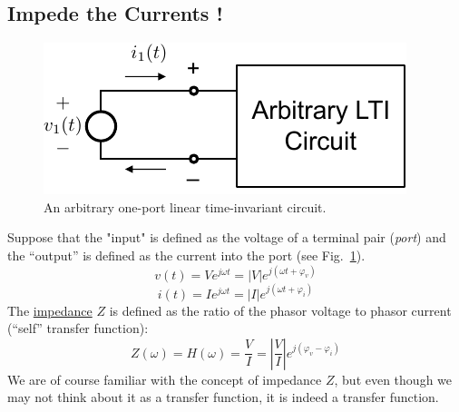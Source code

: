 \subsection{Impede the Currents !}
 \begin{figure}[tb]
\begin{center}
\includegraphics[width=.5\columnwidth]{mod1_3_2_oneport}
\end{center}
\caption{An arbitrary one-port linear time-invariant circuit.}
\label{fig:oneport}
\end{figure}
Suppose that the "input" is defined as the voltage of a terminal pair (\textit{port}) and the “output” is defined as the current into the port (see Fig.~\ref{fig:oneport}).  
    \begin{equation}
        v(t) = V{e^{j\omega t}} = \left| V \right|{e^{j(\omega t + {\varphi _v})}}
    \end{equation}
    \begin{equation}
        i(t) = I{e^{j\omega t}} = \left| I \right|{e^{j(\omega t + {\varphi _i})}}
    \end{equation}
The \underline{impedance} $Z$  is defined as the ratio of the phasor voltage to phasor current (“self” transfer function):
    \begin{equation}
        Z(\omega ) = H(\omega ) = \frac{V}{I} = \left| {\frac{V}{I}} \right|{e^{j({\varphi _v} - {\varphi _i})}}
    \end{equation}
We are of course familiar with the concept of impedance $Z$, but even though we may not think about it as a transfer function, it is indeed a transfer function.
